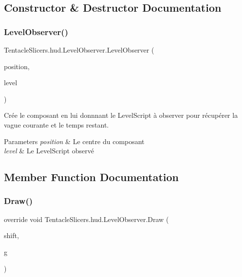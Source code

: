 \subsection{Constructor \& Destructor Documentation}
\mbox{\label{class_tentacle_slicers_1_1hud_1_1_level_observer_a8e419210f3d16e19d0a1860c46c74863}} 
\subsubsection{\texorpdfstring{Level\+Observer()}{LevelObserver()}}
{\footnotesize\ttfamily Tentacle\+Slicers.\+hud.\+Level\+Observer.\+Level\+Observer (\begin{DoxyParamCaption}\item[{Point}]{position,  }\item[{\hyperlink{class_tentacle_slicers_1_1levels_1_1_level_script}{Level\+Script}}]{level }\end{DoxyParamCaption})}



Crée le composant en lui donnnant le Level\+Script à observer pour récupérer la vague courante et le temps restant. 


\begin{DoxyParams}{Parameters}
{\em position} & Le centre du composant \\
\hline
{\em level} & Le Level\+Script observé \\
\hline
\end{DoxyParams}


\subsection{Member Function Documentation}
\mbox{\label{class_tentacle_slicers_1_1hud_1_1_level_observer_aa079c1eabd3ca45dbbd1d8b2b1d977f0}} 
\subsubsection{\texorpdfstring{Draw()}{Draw()}}
{\footnotesize\ttfamily override void Tentacle\+Slicers.\+hud.\+Level\+Observer.\+Draw (\begin{DoxyParamCaption}\item[{Point}]{shift,  }\item[{Graphics}]{g }\end{DoxyParamCaption})\hspace{0.3cm}{\ttfamily [virtual]}}



